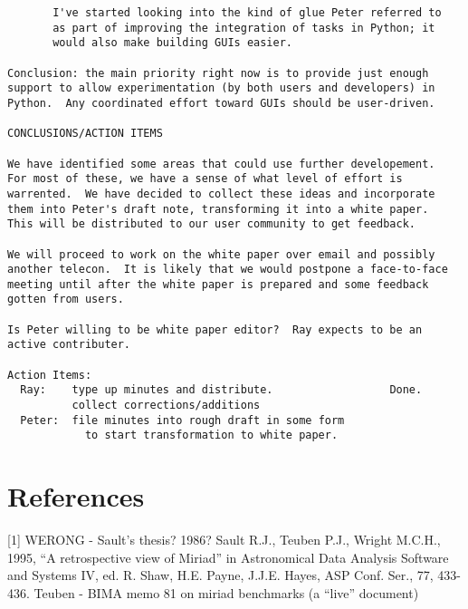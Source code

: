 \begin{verbatim}
       I've started looking into the kind of glue Peter referred to
       as part of improving the integration of tasks in Python; it
       would also make building GUIs easier.  

Conclusion: the main priority right now is to provide just enough
support to allow experimentation (by both users and developers) in
Python.  Any coordinated effort toward GUIs should be user-driven. 

CONCLUSIONS/ACTION ITEMS

We have identified some areas that could use further developement.
For most of these, we have a sense of what level of effort is
warrented.  We have decided to collect these ideas and incorporate
them into Peter's draft note, transforming it into a white paper.
This will be distributed to our user community to get feedback.  

We will proceed to work on the white paper over email and possibly
another telecon.  It is likely that we would postpone a face-to-face
meeting until after the white paper is prepared and some feedback
gotten from users.  

Is Peter willing to be white paper editor?  Ray expects to be an
active contributer.

Action Items:
  Ray:    type up minutes and distribute.                  Done.
          collect corrections/additions
  Peter:  file minutes into rough draft in some form
            to start transformation to white paper.

\end{verbatim}

\section*{References}

[1] WERONG - Sault's thesis? 1986?
\newline
[2] Sault R.J., Teuben P.J., Wright M.C.H., 1995,
 ``A retrospective view of Miriad'' in 
Astronomical Data Analysis Software and Systems IV, 
ed. R. Shaw, H.E. Payne, J.J.E. Hayes, ASP Conf. Ser., 77, 433-436.
\newline
[3] Teuben - BIMA memo 81 on miriad benchmarks (a ``live'' document)
\newline


